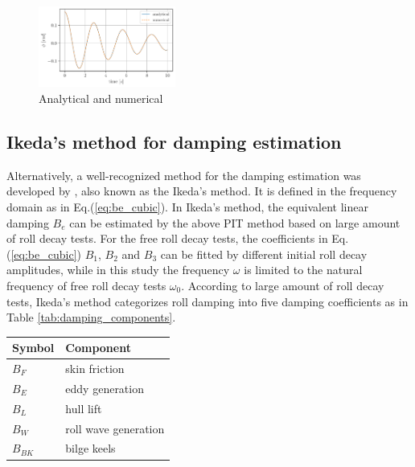     \begin{figure}[t]
        \begin{center}\includegraphics[width = 0.4\textwidth]{figures/analytical_numerical.pdf}\end{center}
        \vspace{-1cm}
        \caption{Analytical and numerical}
        \label{fig:analytical_numerical}
    \end{figure}

\subsection*{Ikeda's method for damping estimation} 
\label{subsec:damping_ikeda}

Alternatively, a well-recognized method for the damping estimation was developed by \cite{7505983/FB64RGPF}, also known as the Ikeda's method. It is defined in the frequency domain as in Eq.(\ref{eq:be_cubic}). In Ikeda's method, the equivalent linear damping $B_e$ can be estimated by the above PIT method based on large amount of roll decay tests. For the free roll decay tests, the coefficients in Eq.(\ref{eq:be_cubic}) $B_1$, $B_2$ and $B_3$ can be fitted by different initial roll decay amplitudes, while in this study the frequency $\omega$ is limited to the natural frequency of free roll decay tests $\omega_0$.  According to large amount of roll decay tests, Ikeda's method categorizes roll damping into five damping coefficients as in Table \ref{tab:damping_components}.\\

\begin{table}[ht]
\centering
\vspace{-0.5cm}
\caption{Damping components in Ikeda's method \label{tab:damping_components}}
\vspace{-0.2cm}
\begin{longtable}[]{@{}ll@{}}
\toprule
Symbol & Component\tabularnewline
\midrule
\endhead
$B_F$ & skin friction\tabularnewline
$B_E$ & eddy generation\tabularnewline
$B_L$ & hull lift\tabularnewline
$B_W$ & roll wave generation\tabularnewline
$B_{BK}$ & bilge keels\tabularnewline
\bottomrule
\end{longtable}
\end{table}

